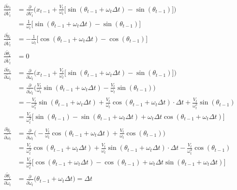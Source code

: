 \documentclass{article}
\begin{document}
\begin{enumerate}[label=(\roman*)]
\begin{equation}
\begin{aligned}
\frac{\partial \tilde x_t}{\partial \tilde V_t}
&= \frac{\partial}{\partial \tilde V_t} \Bigg( x_{t-1} + \frac{V_t}{\omega_t} \Big[ \sin(\theta_{t-1} + \omega_t\Delta t) - \sin(\theta_{t-1}) \Big] \Bigg) \\
&= \frac{1}{\omega_t} \Big[ \sin(\theta_{t-1} + \omega_t\Delta t) - \sin(\theta_{t-1}) \Big]
\\
\frac{\partial \tilde y_t}{\partial \tilde V_t}
&= -\frac{1}{\omega_t} \Big[ \cos(\theta_{t-1} + \omega_t\Delta t) - \cos(\theta_{t-1}) \Big]
\\
\frac{\partial \tilde \theta_t}{\partial \tilde V_t} &= 0 \\
\frac{\partial \tilde x_t}{\partial \tilde \omega_t}
&= \frac{\partial}{\partial \tilde \omega_t} \Bigg( x_{t-1} + \frac{V_t}{\omega_t} \Big[ \sin(\theta_{t-1} + \omega_t\Delta t) - \sin(\theta_{t-1}) \Big] \Bigg) \\
&= \frac{\partial}{\partial \tilde \omega_t} \Bigg( \frac{V_t}{\omega_t}\sin(\theta_{t-1} + \omega_t\Delta t) - \frac{V_t}{\omega_t}\sin(\theta_{t-1}) \Bigg) \\
&= -\frac{V_t}{\omega_t^2} \sin(\theta_{t-1} + \omega_t\Delta t) + \frac{V_t}{\omega_t}\cos(\theta_{t-1} + \omega_t\Delta t) \cdot \Delta t + \frac{V_t}{\omega_t^2}\sin(\theta_{t-1}) \\
&= \frac{V_t}{\omega_t^2} \Big [ \sin(\theta_{t-1}) - \sin(\theta_{t-1} + \omega_t\Delta t) + \omega_t \Delta t \cos(\theta_{t-1} + \omega_t\Delta t) \Big]
\\
\frac{\partial \tilde y_t}{\partial \tilde \omega_t}
&= \frac{\partial}{\partial \tilde \omega_t} \Bigg( -\frac{V_t}{\omega_t}\cos(\theta_{t-1} + \omega_t\Delta t) + \frac{V_t}{\omega_t}\cos(\theta_{t-1}) \Bigg) \\
&= \frac{V_t}{\omega_t^2}\cos(\theta_{t-1} + \omega_t\Delta t) + \frac{V_t}{\omega_t}\sin(\theta_{t-1} + \omega_t\Delta t) \cdot \Delta t - \frac{V_t}{\omega_t^2}\cos(\theta_{t-1}) \\
&= \frac{V_t}{\omega_t^2} \Big [ \cos(\theta_{t-1} + \omega_t\Delta t) - \cos(\theta_{t-1}) + \omega_t \Delta t \sin(\theta_{t-1} + \omega_t\Delta t) \Big]
\\
\frac{\partial \tilde \theta_t}{\partial \tilde \omega_t}
&= \frac{\partial}{\partial \tilde \omega_t} \Bigg( \theta_{t-1} + \omega_t \Delta t \Bigg) = \Delta t
\end{aligned}
\end{equation}


\end{enumerate}
\end{document}
